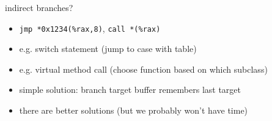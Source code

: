 \begin{frame}[fragile,label=indirectBranch]{indirect branches?}
\lstset{language=myasm}
\begin{itemize}
\item \lstinline|jmp *0x1234(%rax,8)|, \lstinline|call *(%rax)|
\item e.g. switch statement (jump to case with table)
\item e.g. virtual method call (choose function based on which subclass)
\vspace{.5cm}
\item simple solution: branch target buffer remembers last target
\item there are better solutions (but we probably won't have time)
\end{itemize}
\end{frame}
